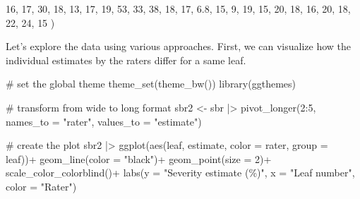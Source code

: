 \documentclass[
  letterpaper,
  DIV=11,
  numbers=noendperiod]{scrreprt}
\newenvironment{Shaded}{\begin{snugshade}}{\end{snugshade}}
\newcommand{\AttributeTok}[1]{\textcolor[rgb]{0.40,0.45,0.13}{#1}}
\newcommand{\CommentTok}[1]{\textcolor[rgb]{0.37,0.37,0.37}{#1}}
\newcommand{\DecValTok}[1]{\textcolor[rgb]{0.68,0.00,0.00}{#1}}
\newcommand{\FloatTok}[1]{\textcolor[rgb]{0.68,0.00,0.00}{#1}}
\newcommand{\FunctionTok}[1]{\textcolor[rgb]{0.28,0.35,0.67}{#1}}
\newcommand{\NormalTok}[1]{\textcolor[rgb]{0.00,0.23,0.31}{#1}}
\newcommand{\OtherTok}[1]{\textcolor[rgb]{0.00,0.23,0.31}{#1}}
\newcommand{\SpecialCharTok}[1]{\textcolor[rgb]{0.37,0.37,0.37}{#1}}
\newcommand{\StringTok}[1]{\textcolor[rgb]{0.13,0.47,0.30}{#1}}
\begin{document}
\begin{Shaded}
\begin{Highlighting}[]
\DecValTok{16}\NormalTok{, }\DecValTok{17}\NormalTok{,  }\DecValTok{30}\NormalTok{,   }\DecValTok{18}\NormalTok{,  }\DecValTok{13}\NormalTok{,}
\DecValTok{17}\NormalTok{, }\DecValTok{19}\NormalTok{,  }\DecValTok{53}\NormalTok{,   }\DecValTok{33}\NormalTok{,  }\DecValTok{38}\NormalTok{,}
\DecValTok{18}\NormalTok{, }\DecValTok{17}\NormalTok{, }\FloatTok{6.8}\NormalTok{,   }\DecValTok{15}\NormalTok{,   }\DecValTok{9}\NormalTok{,}
\DecValTok{19}\NormalTok{, }\DecValTok{15}\NormalTok{,  }\DecValTok{20}\NormalTok{,   }\DecValTok{18}\NormalTok{,  }\DecValTok{16}\NormalTok{,}
\DecValTok{20}\NormalTok{, }\DecValTok{18}\NormalTok{,  }\DecValTok{22}\NormalTok{,   }\DecValTok{24}\NormalTok{,  }\DecValTok{15}
\NormalTok{         )}
\end{Highlighting}
\end{Shaded}

Let's explore the data using various approaches. First, we can visualize
how the individual estimates by the raters differ for a same leaf.

\begin{Shaded}
\begin{Highlighting}[]
\CommentTok{\# set the global theme}
\FunctionTok{theme\_set}\NormalTok{(}\FunctionTok{theme\_bw}\NormalTok{())}
\FunctionTok{library}\NormalTok{(ggthemes)}

\CommentTok{\# transform from wide to long format}
\NormalTok{sbr2 }\OtherTok{\textless{}{-}}\NormalTok{ sbr }\SpecialCharTok{|\textgreater{}} 
  \FunctionTok{pivot\_longer}\NormalTok{(}\DecValTok{2}\SpecialCharTok{:}\DecValTok{5}\NormalTok{, }\AttributeTok{names\_to =} \StringTok{"rater"}\NormalTok{,}
               \AttributeTok{values\_to =} \StringTok{"estimate"}\NormalTok{) }

\CommentTok{\# create the plot}
\NormalTok{sbr2 }\SpecialCharTok{|\textgreater{}} 
  \FunctionTok{ggplot}\NormalTok{(}\FunctionTok{aes}\NormalTok{(leaf, estimate, }\AttributeTok{color =}\NormalTok{ rater,}
             \AttributeTok{group =}\NormalTok{ leaf))}\SpecialCharTok{+}
  \FunctionTok{geom\_line}\NormalTok{(}\AttributeTok{color =} \StringTok{"black"}\NormalTok{)}\SpecialCharTok{+}
  \FunctionTok{geom\_point}\NormalTok{(}\AttributeTok{size =} \DecValTok{2}\NormalTok{)}\SpecialCharTok{+}
  \FunctionTok{scale\_color\_colorblind}\NormalTok{()}\SpecialCharTok{+}
  \FunctionTok{labs}\NormalTok{(}\AttributeTok{y =} \StringTok{"Severity estimate (\%)"}\NormalTok{,}
       \AttributeTok{x =} \StringTok{"Leaf number"}\NormalTok{,}
       \AttributeTok{color =} \StringTok{"Rater"}\NormalTok{)}
\end{Highlighting}
\end{Shaded}
\end{document}
